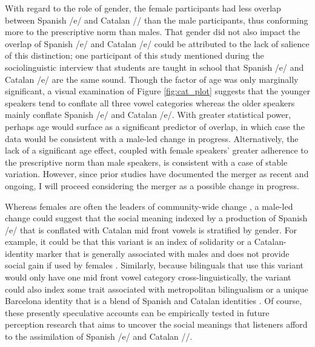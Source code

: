 \documentclass[output=paper,colorlinks,citecolor=brown,draftmode]{langscibook}
\begin{document}
With regard to the role of gender, the female participants had less overlap between Spanish /e/ and Catalan /\textepsilon/ than the male participants, thus conforming more to the prescriptive norm than males. That gender did not also impact the overlap of Spanish /e/ and Catalan /e/ could be attributed to the lack of salience of this distinction; one participant of this study mentioned during the sociolinguistic interview that students are taught in school that Spanish /e/ and Catalan /e/ are the same sound. Though the factor of age was only marginally significant, a visual examination of Figure \ref{fig:cat_plot} suggests that the younger speakers tend to conflate all three vowel categories whereas the older speakers mainly conflate Spanish /e/ and Catalan /e/. With greater statistical power, perhaps age would surface as a significant predictor of overlap, in which case the data would be consistent with a male-led change in progress. Alternatively, the lack of a significant age effect, coupled with female speakers' greater adherence to the prescriptive norm than male speakers, is consistent with a case of stable variation. However, since prior studies \citep[e.g.,][]{mora2012} have documented the merger as recent and ongoing, I will proceed considering the merger as a possible change in progress.

\hspace*{-1.7pt}Whereas females are often the leaders of community-wide change \citep{labov2001principles}, a male-led change could suggest that the social meaning indexed by a production of Spanish /e/ that is conflated with Catalan mid front vowels is stratified by gender. For example, it could be that this variant is an index of solidarity or a Catalan-identity marker \citep[akin to lateral velarization and other phonetic phenomena;][]{davidson2019covert} that is generally associated with males and does not provide social gain if used by females \citep{chappell2016social}. Similarly, because bilinguals that use this variant would only have one mid front vowel category cross-linguistically, the variant could also index some trait associated with metropolitan bilingualism or a unique Barcelona identity that is a blend of Spanish and Catalan identities \citep{newman2015language}. Of course, these presently speculative accounts can be empirically tested in future perception research that aims to uncover the social meanings that listeners afford to the assimilation of Spanish /e/ and Catalan /\textepsilon/.
\end{document}
